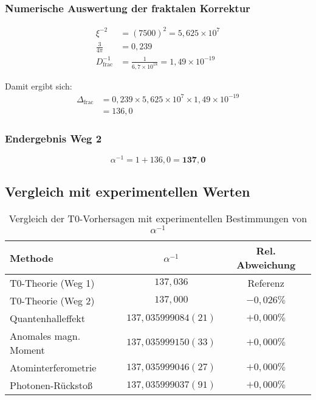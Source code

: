 \documentclass[12pt,a4paper]{article}
\theoremstyle{definition}
\begin{document}
	\subsubsection{Numerische Auswertung der fraktalen Korrektur}
	
	\begin{align}
		\xi^{-2} &= \left(7500\right)^2 = 5{,}625 \times 10^7 \\
		\frac{3}{4\pi} &= 0{,}239 \\
		D_{\text{frac}}^{-1} &= \frac{1}{6{,}7 \times 10^{18}} = 1{,}49 \times 10^{-19}
	\end{align}
	
	Damit ergibt sich:
	\begin{align}
		\Delta_{\text{frac}} &= 0{,}239 \times 5{,}625 \times 10^7 \times 1{,}49 \times 10^{-19} \\
		&= 136{,}0
	\end{align}
	
	\subsubsection{Endergebnis Weg 2}
	
	\begin{equation}
		\alpha^{-1} = 1 + 136{,}0 = \mathbf{137{,}0}
	\end{equation}
	
	\subsection{Vergleich mit experimentellen Werten}
	
	\begin{table}[h]
		\centering
		\begin{tabular}{lcc}
			\hline
			\textbf{Methode} & \textbf{$\alpha^{-1}$} & \textbf{Rel. Abweichung} \\
			\hline
			T0-Theorie (Weg 1) & $137{,}036$ & Referenz \\
			T0-Theorie (Weg 2) & $137{,}000$ & $-0{,}026\%$ \\
			\hline
			Quantenhalleffekt & $137{,}035999084(21)$ & $+0{,}000\%$ \\
			Anomales magn. Moment & $137{,}035999150(33)$ & $+0{,}000\%$ \\
			Atominterferometrie & $137{,}035999046(27)$ & $+0{,}000\%$ \\
			Photonen-Rückstoß & $137{,}035999037(91)$ & $+0{,}000\%$ \\
			\hline
		\end{tabular}
		\caption{Vergleich der T0-Vorhersagen mit experimentellen Bestimmungen von $\alpha^{-1}$}
		\label{tab:alpha_comparison}
	\end{table}
	
\end{document}
